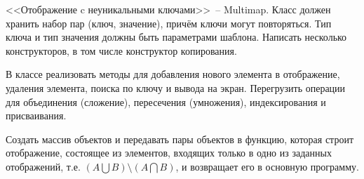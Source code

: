 
<<Отображение c неуникальными ключами>>~-- Multimap. Класс должен хранить набор
пар (ключ, значение), причём ключи могут повторяться. Тип ключа и тип значения должны
быть параметрами шаблона. Написать несколько конструкторов, в том числе конструктор
копирования.

В классе реализовать методы для добавления нового элемента в
отображение, удаления элемента, поиска по ключу и вывода на экран. Перегрузить
операции для объединения (сложение), пересечения (умножения), индексирования и
присваивания.

Создать массив объектов и передавать пары объектов в функцию, которая
строит отображение, состоящее из элементов, входящих только в одно из заданных
отображений, т.е. $(A\bigcup B) \setminus (A\bigcap B)$, и возвращает его в основную программу.
